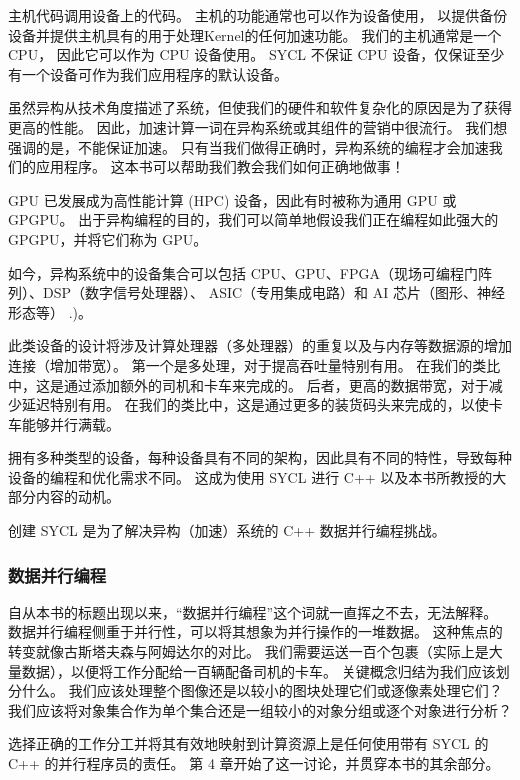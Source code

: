 \begin{remark}
	主机代码调用设备上的代码。 主机的功能通常也可以作为设备使用，
	以提供备份设备并提供主机具有的用于处理Kernel的任何加速功能。 我们的主机通常是一个 CPU，
	因此它可以作为 CPU 设备使用。 SYCL 不保证 CPU 设备，仅保证至少有一个设备可作为我们应用程序的默认设备。
\end{remark}

虽然异构从技术角度描述了系统，但使我们的硬件和软件复杂化的原因是为了获得更高的性能。 
因此，加速计算一词在异构系统或其组件的营销中很流行。 我们想强调的是，不能保证加速。 
只有当我们做得正确时，异构系统的编程才会加速我们的应用程序。 这本书可以帮助我们教会我们如何正确地做事！

GPU 已发展成为高性能计算 (HPC) 设备，因此有时被称为通用 GPU 或 GPGPU。 
出于异构编程的目的，我们可以简单地假设我们正在编程如此强大的 GPGPU，并将它们称为 GPU。

如今，异构系统中的设备集合可以包括 CPU、GPU、FPGA（现场可编程门阵列）、DSP（数字信号处理器）、
ASIC（专用集成电路）和 AI 芯片（图形、神经形态等） .)。

此类设备的设计将涉及计算处理器（多处理器）的重复以及与内存等数据源的增加连接（增加带宽）。 
第一个是多处理，对于提高吞吐量特别有用。 在我们的类比中，这是通过添加额外的司机和卡车来完成的。 
后者，更高的数据带宽，对于减少延迟特别有用。 在我们的类比中，这是通过更多的装货码头来完成的，以使卡车能够并行满载。

拥有多种类型的设备，每种设备具有不同的架构，因此具有不同的特性，导致每种设备的编程和优化需求不同。 
这成为使用 SYCL 进行 C++ 以及本书所教授的大部分内容的动机。

\begin{remark}
	创建 SYCL 是为了解决异构（加速）系统的 C++ 数据并行编程挑战。
\end{remark}

\subsubsection{数据并行编程}

自从本书的标题出现以来，“数据并行编程”这个词就一直挥之不去，无法解释。 
数据并行编程侧重于并行性，可以将其想象为并行操作的一堆数据。 这种焦点的转变就像古斯塔夫森与阿姆达尔的对比。 
我们需要运送一百个包裹（实际上是大量数据），以便将工作分配给一百辆配备司机的卡车。 关键概念归结为我们应该划分什么。 
我们应该处理整个图像还是以较小的图块处理它们或逐像素处理它们？ 
我们应该将对象集合作为单个集合还是一组较小的对象分组或逐个对象进行分析？

选择正确的工作分工并将其有效地映射到计算资源上是任何使用带有 SYCL 的 C++ 的并行程序员的责任。 
第 4 章开始了这一讨论，并贯穿本书的其余部分。

